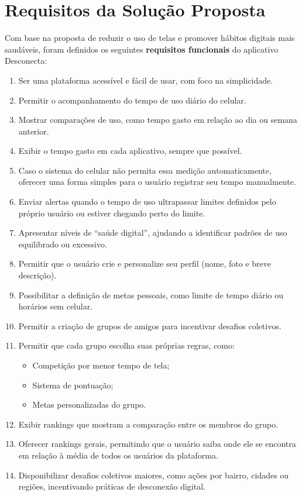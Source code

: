 \section{Requisitos da Solução Proposta}

Com base na proposta de reduzir o uso de telas e promover hábitos digitais mais saudáveis, foram definidos os seguintes \textbf{requisitos funcionais} do aplicativo Desconecta:

\begin{enumerate}
    \item Ser uma plataforma acessível e fácil de usar, com foco na simplicidade.
    \item Permitir o acompanhamento do tempo de uso diário do celular.
    \item Mostrar comparações de uso, como tempo gasto em relação ao dia ou semana anterior.
    \item Exibir o tempo gasto em cada aplicativo, sempre que possível.
    \item Caso o sistema do celular não permita essa medição automaticamente, oferecer uma forma simples para o usuário registrar seu tempo manualmente.
    \item Enviar alertas quando o tempo de uso ultrapassar limites definidos pelo próprio usuário ou estiver chegando perto do limite.
    \item Apresentar níveis de “saúde digital”, ajudando a identificar padrões de uso equilibrado ou excessivo.
    \item Permitir que o usuário crie e personalize seu perfil (nome, foto e breve descrição).
    \item Possibilitar a definição de metas pessoais, como limite de tempo diário ou horários sem celular.
    \item Permitir a criação de grupos de amigos para incentivar desafios coletivos.
    \item Permitir que cada grupo escolha suas próprias regras, como:
    \begin{itemize}
        \item Competição por menor tempo de tela;
        \item Sistema de pontuação;
        \item Metas personalizadas do grupo.
    \end{itemize}
    \item Exibir rankings que mostram a comparação entre os membros do grupo.
    \item Oferecer rankings gerais, permitindo que o usuário saiba onde ele se encontra em relação à média de todos os usuários da plataforma.
    \item Disponibilizar desafios coletivos maiores, como ações por bairro, cidades ou regiões, incentivando práticas de desconexão digital.
\end{enumerate}
